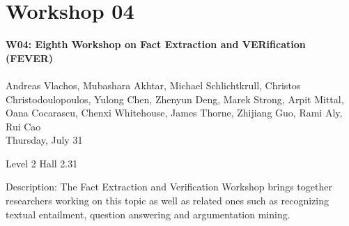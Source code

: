 \clearpage


\section[W04: Eighth Workshop on Fact Extraction and VERification (FEVER)]{Workshop 04}
\label{workshop_4}

\begin{center}
    {\Large \textbf{W04: Eighth Workshop on Fact Extraction and VERification (FEVER)}}\\
\\

    Andreas Vlachos, Mubashara Akhtar, Michael Schlichtkrull, Christos Christodoulopoulos, Yulong Chen, Zhenyun Deng, Marek Strong, Arpit Mittal, Oana Cocarascu, Chenxi Whitehouse, James Thorne, Zhijiang Guo, Rami Aly, Rui Cao\\

     Thursday, July 31
    
    Level 2 Hall 2.31

\end{center}

Description: The Fact Extraction and Verification Workshop brings together researchers working on this topic as well as related ones such as recognizing textual entailment, question answering and argumentation mining.

